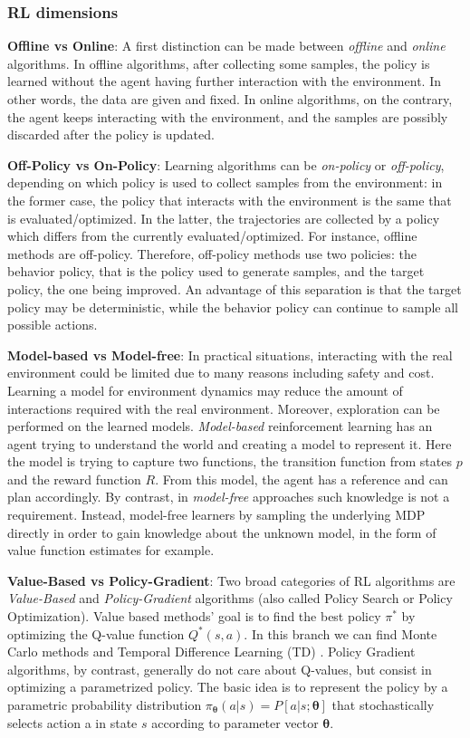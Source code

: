 \subsubsection{RL dimensions}

\textbf{Offline vs Online}:
A first distinction can be made between \textit{offline} and \textit{online} algorithms. In offline algorithms, after collecting some samples, the policy is learned without the agent having further interaction with the environment. In other words, the data are given and fixed. In online algorithms, on the contrary, the agent keeps interacting with the environment, and the samples are possibly discarded after the policy is updated.

\textbf{Off-Policy vs On-Policy}:
Learning algorithms can be \textit{on-policy} or \textit{off-policy}, depending on which policy is used to collect samples from the environment: in the former case, the policy that interacts with the environment is the same that is evaluated/optimized. In the latter, the trajectories are collected by a policy which differs from the currently evaluated/optimized. For instance, offline methods are off-policy. Therefore, off-policy methods use two policies: the behavior policy, that is the policy used to generate samples, and the target policy, the one being improved. An advantage of this separation is that the target policy may be deterministic, while the behavior policy can continue to sample all possible actions.

\textbf{Model-based vs Model-free}:
In practical situations, interacting with the real environment could be limited due to many reasons including safety and cost. Learning a model for environment dynamics may reduce the amount of interactions required with the real environment. Moreover, exploration can be performed on the learned models.
\textit{Model-based} reinforcement learning has an agent trying to understand the world and creating a model to represent it. Here the model is trying to capture two functions, the transition function from states $p$ and the reward function $R$. From this model, the agent has a reference and can plan accordingly.
By contrast, in \textit{model-free} approaches such knowledge is not a requirement. Instead, model-free learners by sampling the underlying MDP directly in order to gain knowledge about the unknown model, in the form of value function estimates for example. 

\textbf{Value-Based vs Policy-Gradient}:
Two broad categories of RL algorithms are \textit{Value-Based} and \textit{Policy-Gradient} algorithms (also called Policy Search or Policy Optimization). Value based methods' goal is to find the best policy $\pi^*$ by optimizing the Q-value function $Q^*(s,a)$. In this branch we can find Monte Carlo methods \cite{mc} and Temporal Difference Learning (TD) \cite{td}. Policy Gradient algorithms, by contrast, generally do not care about Q-values, but consist in optimizing a parametrized policy. The basic idea is to represent the policy by a parametric probability distribution \(\pi_{\boldsymbol \theta}(a|s) = P [a|s; \boldsymbol \theta] \) that stochastically selects action a in state $s$ according to parameter vector $\boldsymbol \theta$. 

